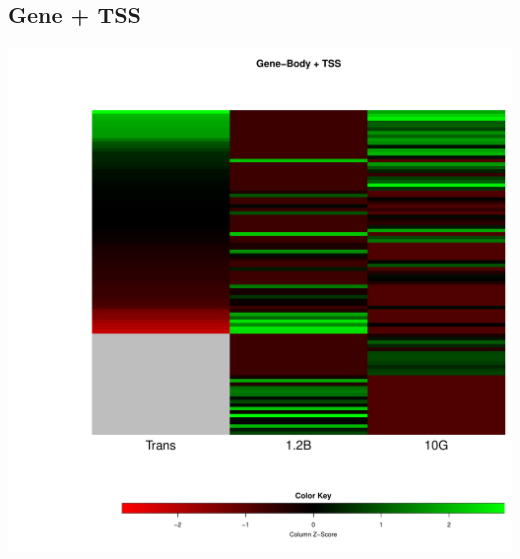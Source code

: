 \documentclass{article}\usepackage[]{graphicx}\usepackage[]{color}
\newenvironment{knitrout}{}{} %
\begin{document}
\subsection{Gene + TSS}
\begin{knitrout}
\color{fgcolor}

{\centering \includegraphics[width=.9\linewidth]{figure/minimal-heatmap_gene_tss-1} 

}



\end{knitrout}
\clearpage
\end{document}

